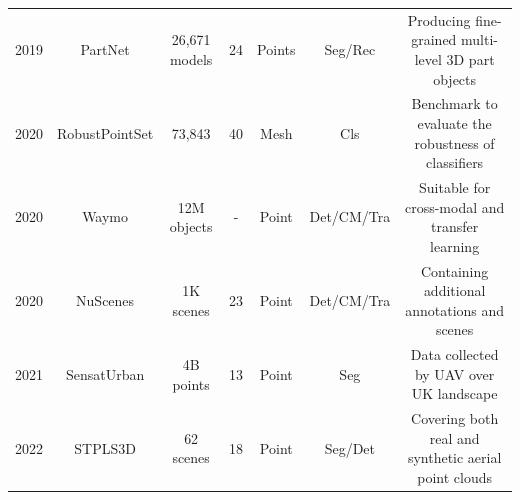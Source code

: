 \documentclass[a4paper,fleqn]{cas-dc}
\begin{document}
\begin{table}[]
{\begin{tabular}{|c|c|c|c|c|c|c|}
        2019 & PartNet \citep{mo2019partnet} & 26,671 models & 24 & Points & Seg/Rec & Producing fine-grained multi-level 3D part objects \\
        2020 & RobustPointSet \citep{taghanaki2020robustpointset} & 73,843 & 40 & Mesh & Cls & Benchmark to evaluate the robustness of classifiers \\
        2020 & Waymo \citep{sun2020scalability} & 12M objects & - & Point & Det/CM/Tra & Suitable for cross-modal and transfer learning \\
        2020 & NuScenes \citep{caesar2020nuscenes} & 1K scenes & 23 & Point & Det/CM/Tra & Containing additional annotations and scenes \\
        2021 & SensatUrban \citep{hu2021towards} & 4B points & 13 & Point & Seg & Data collected by UAV over UK landscape \\ 
        2022 & STPLS3D \citep{chen2022stpls3d} & 62 scenes & 18 & Point & Seg/Det & Covering both real and synthetic aerial point clouds \\
        \hline
        
    \end{tabular}}

\end{table}
\end{document}
